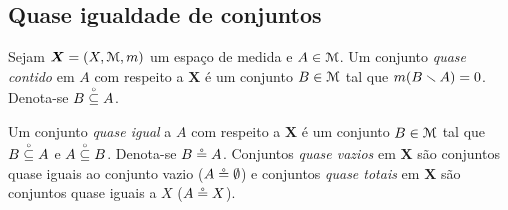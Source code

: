 \subsection{Quase igualdade de conjuntos}

\begin{definition}
Sejam $\bm X=(X,\mathcal{M},m)$ um espaço de medida e $A \in \mathcal{M}$. Um conjunto \emph{quase contido} em $A$ com respeito a $\bm X$ é um conjunto $B \in \mathcal{M}$ tal que $m(B \smallsetminus A) = 0$. Denota-se $B \qsubset A$.

Um conjunto \emph{quase igual} a $A$ com respeito a $\bm X$ é um conjunto $B \in \mathcal{M}$ tal que $B \qsubset A$ e $A \qsubset B$. Denota-se $B \circeq A$. Conjuntos \emph{quase vazios} em $\bm X$ são conjuntos quase iguais ao conjunto vazio ($A \circeq \emptyset$) e conjuntos \emph{quase totais} em $\bm X$ são conjuntos quase iguais a $X$ ($A \circeq X$).

\end{definition}

